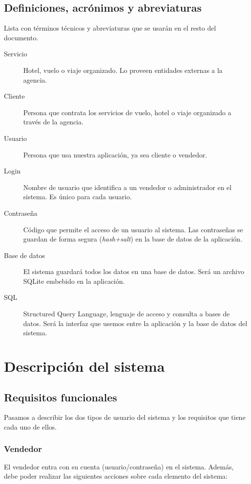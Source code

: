 \documentclass[12pt,a4paper,titlepage]{article}
\begin{document}
\subsection{Definiciones, acrónimos y abreviaturas}

Lista con términos técnicos y abreviaturas que se usarán en el resto del documento.

\begin{description}
\item[Servicio] Hotel, vuelo o viaje organizado. Lo proveen entidades externas a la agencia.
\item[Cliente] Persona que contrata los servicios de vuelo, hotel o viaje organizado a través de la agencia.
\item[Usuario] Persona que usa nuestra aplicación, ya sea cliente o vendedor.
\item[Login] Nombre de usuario que identifica a un vendedor o administrador en el sistema. Es único para cada usuario.
\item[Contraseña] Código que permite el acceso de un usuario al sistema. Las contraseñas se guardan de forma segura (\textit{hash+salt}) en la base de datos de la aplicación.
\item[Base de datos] El sistema guardará todos los datos en una base de datos. Será un archivo SQLite embebido en la aplicación.
\item[SQL] Structured Query Language, lenguaje de acceso y consulta a bases de datos. Será la interfaz que usemos entre la aplicación y la base de datos del sistema.
\end{description}

\section{Descripción del sistema}

\subsection{Requisitos funcionales}

Pasamos a describir los dos tipos de usuario del sistema y los requisitos que tiene cada uno de ellos.

\subsubsection{Vendedor}

El vendedor entra con su cuenta (usuario/contraseña) en el sistema. Además, debe poder realizar las siguientes acciones sobre cada elemento del sistema:
\end{document}
